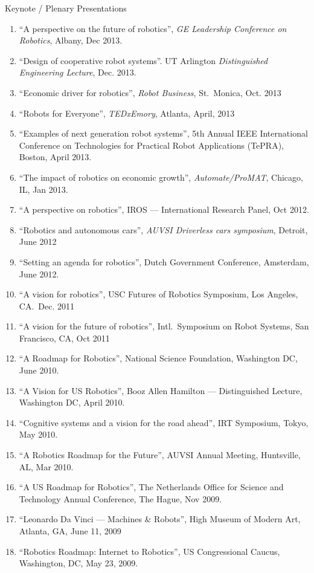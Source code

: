 \documentclass{article}
\begin{document}
\begin{cv}
\begin{cvlist}{Keynote / Plenary Presentations}
\begin{enumerate}
			\item ``A perspective on the future of robotics'', {\em GE Leadership Conference on Robotics}, Albany, Dec 2013.
			\item ``Design of cooperative robot systems''. UT Arlington {\em Distinguished Engineering Lecture}, Dec. 2013.
			\item ``Economic driver for robotics'', {\em Robot Business}, St.\ Monica,  Oct. 2013
			\item ``Robots for Everyone'', {\em TEDxEmory}, Atlanta, April, 2013
			\item ``Examples of next generation robot systems'', 5th Annual IEEE
			      International Conference on Technologies for Practical Robot
			      Applications (TePRA), Boston, April 2013.
			\item ``The impact of robotics on economic growth'', {\em Automate/ProMAT}, Chicago, IL, Jan 2013.
			\item ``A perspective on robotics'', IROS --- International Research  Panel, Oct 2012.
			\item ``Robotics and autonomous cars'', {\em AUVSI Driverless cars symposium}, Detroit, June 2012
			\item ``Setting an agenda for robotics'', Dutch Government  Conference, Amsterdam, June 2012.
			\item ``A vision for robotics'', USC Futures of Robotics Symposium, Los Angeles, CA.\  Dec. 2011
			\item ``A vision for the future of robotics'', Intl.\ Symposium on Robot Systems, San Francisco, CA, Oct 2011
			\item ``A Roadmap for Robotics'', National Science Foundation,  Washington DC, June 2010.
			\item ``A Vision for US Robotics'', Booz Allen Hamilton ---  Distinguished Lecture, Washington DC, April 2010.
			\item ``Cognitive systems and a vision for the road ahead'', IRT  Symposium, Tokyo, May 2010.
			\item ``A Robotics Roadmap for the Future'', AUVSI Annual Meeting, Huntsville, AL, Mar 2010.
			\item ``A US Roadmap for Robotics'', The Netherlands Office for Science and Technology Annual Conference, The Hague, Nov 2009.
			\item ``Leonardo Da Vinci --- Machines \& Robots'', High Museum of Modern Art, Atlanta, GA, June 11, 2009
			\item ``Robotics Roadmap: Internet to Robotics'', US Congressional Caucus, Washington, DC, May 23, 2009.

\end{enumerate}
\end{cvlist}
\end{cv}
\end{document}

